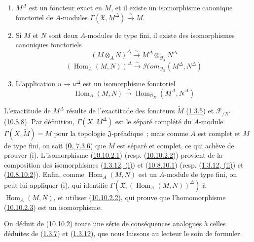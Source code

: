 \begin{proposition}[10.10.2]
\label{I.10.10.2-fr}
\medskip\noindent
\begin{enumerate}
  \item[\rm{(i)}] $M^\Delta$ est un foncteur exact en $M$, et il existe
    un isomorphisme canonique fonctoriel de $A$-modules
    $\Gamma(\mathfrak{X},M^\Delta)\xrightarrow{\sim}M$.
  \item[\rm{(ii)}] Si $M$ et $N$ sont deux $A$-modules de type fini, il
    existe des isomorphismes canoniques fonctoriels
    \[
      (M\otimes_A N)^\Delta
      \xrightarrow{\sim}
      M^\Delta\otimes_{\mathscr{O}_{\mathfrak{X}}}N^\Delta
      \tag{10.10.2.1}\label{I.10.10.2.1-fr}
    \]
    \[
      (\operatorname{Hom}_A(M,N))^\Delta
      \xrightarrow{\sim}
      \mathscr{H}\!om_{\mathscr{O}_{\mathfrak{X}}}
      (M^\Delta,N^\Delta)
      \tag{10.10.2.2}\label{I.10.10.2.2-fr}
    \]
  \item[\rm{(iii)}] L'application $u\to u^\Delta$ est un isomorphisme
    fonctoriel
    \[
      \operatorname{Hom}_A(M,N)
      \xrightarrow{\sim}
      \operatorname{Hom}_{\mathscr{O}_X}
      (M^\Delta,N^\Delta)
      \tag{10.10.2.3}\label{I.10.10.2.3-fr}
    \]
\end{enumerate}
\end{proposition}

L'exactitude de $M^\Delta$ résulte de l'exactitude des foncteurs
$\widetilde M$ (\hyperref[I.1.3.5-fr]{1.3.5}) et
$\mathscr{F}_{/X'}$ (\hyperref[I.10.8.8-fr]{10.8.8}). Par
définition, $\Gamma(X,M^\Delta)$ est le séparé complété du
$A$-module $\Gamma(X,\widetilde M)=M$ pour la topologie
$\mathfrak{J}$-préadique~; mais comme $A$ est complet et $M$ de type
fini, on sait (\hyperref[0.7.3.6-fr]{\textbf{0}, 7.3.6}) que $M$ est séparé et
complet, ce qui achève de prouver (i). L'isomorphisme
(\hyperref[I.10.10.2.1-fr]{10.10.2.1}) (resp.
(\hyperref[I.10.10.2.2-fr]{10.10.2.2})) provient de la composition des
isomorphismes (\hyperref[I.1.3.12-fr]{1.3.12, (i)}) et
(\hyperref[I.10.8.10.1-fr]{10.8.10.1}) (resp.
(\hyperref[I.1.3.12-fr]{1.3.12, (ii)}) et
(\hyperref[I.10.8.10.2-fr]{10.8.10.2})). Enfin, comme
$\operatorname{Hom}_A(M,N)$ est un $A$-module de type fini, on peut lui
appliquer (i), qui identifie
$\Gamma(\mathfrak{X},(\operatorname{Hom}_A(M,N))^\Delta)$ à
$\operatorname{Hom}_A(M,N)$, et utiliser
(\hyperref[I.10.10.2.2-fr]{10.10.2.2}), qui prouve que
l'homomorphisme (\hyperref[I.10.10.2.3-fr]{10.10.2.3}) est un
isomorphisme.

On déduit de (\hyperref[I.10.10.2-fr]{10.10.2}) toute une série de
conséquences analogues à celles déduites de
(\hyperref[I.1.3.7-fr]{1.3.7}) et
(\hyperref[I.1.3.12-fr]{1.3.12}), que nous laissons au lecteur le soin
de formuler.

